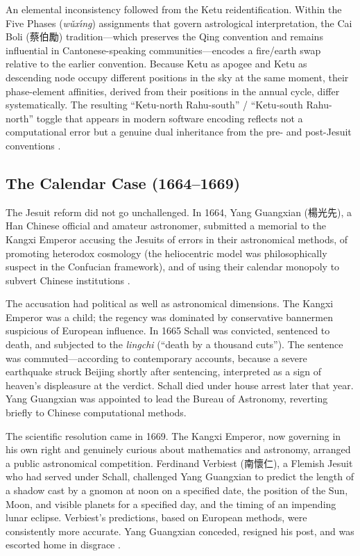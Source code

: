 \documentclass[10pt,a4paper]{article}
\newcommand{\zh}[1]{#1}
\begin{document}
An elemental inconsistency followed from the Ketu reidentification.
Within the Five Phases (\textit{w\v{u}x\'{\i}ng})
assignments that govern astrological interpretation, the Cai Boli
(\zh{蔡伯勵}) tradition---which preserves the Qing convention and
remains influential in Cantonese-speaking communities---encodes a
fire/earth swap relative to the earlier convention.  Because
Ketu as apogee and Ketu as descending node occupy
different positions in the sky at the same moment, their
phase-element affinities, derived from their positions in the
annual cycle, differ systematically.  The resulting
``Ketu-north Rahu-south'' / ``Ketu-south Rahu-north'' toggle that appears in modern software
encoding reflects not a computational error but a genuine dual
inheritance from the pre- and post-Jesuit conventions
\cite{liu2020missionary}.

\subsection*{The Calendar Case (1664--1669)}

The Jesuit reform did not go unchallenged.  In 1664, Yang Guangxian
(\zh{楊光先}), a Han Chinese official and amateur astronomer,
submitted a memorial to the Kangxi Emperor accusing the Jesuits
of errors in their astronomical methods, of promoting heterodox
cosmology (the heliocentric model was philosophically suspect in
the Confucian framework), and of using their calendar monopoly to
subvert Chinese institutions \cite{jami2015calendar}.

The accusation had political as well as astronomical dimensions.
The Kangxi Emperor was a child; the regency was dominated by
conservative bannermen suspicious of European influence.  In 1665
Schall was convicted, sentenced to death, and subjected to the
\textit{lingchi} (``death by a thousand cuts'').  The sentence was
commuted---according to contemporary accounts, because a severe
earthquake struck Beijing shortly after sentencing, interpreted as
a sign of heaven's displeasure at the verdict.  Schall died under
house arrest later that year.  Yang Guangxian was appointed to lead
the Bureau of Astronomy, reverting briefly to Chinese computational
methods.

The scientific resolution came in 1669.  The Kangxi Emperor, now
governing in his own right and genuinely curious about mathematics
and astronomy, arranged a public astronomical competition.  Ferdinand
Verbiest (\zh{南懷仁}), a Flemish Jesuit who had served under
Schall, challenged Yang Guangxian to predict the length of a shadow
cast by a gnomon at noon on a specified date, the position of the
Sun, Moon, and visible planets for a specified day, and the timing
of an impending lunar eclipse.  Verbiest's predictions, based on
European methods, were consistently more accurate.  Yang Guangxian
conceded, resigned his post, and was escorted home in disgrace
\cite{jami2015calendar}.
\end{document}
